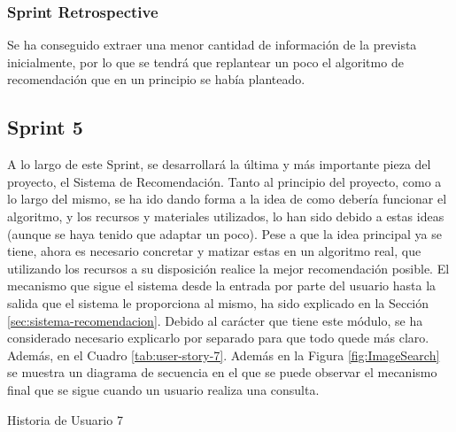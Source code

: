 \subsubsection{Sprint Retrospective}

Se ha conseguido extraer una menor cantidad de información de la prevista inicialmente, por lo que se tendrá que replantear un poco el algoritmo de recomendación que en un principio se había planteado.

\subsection{Sprint 5}
A lo largo de este Sprint, se desarrollará la última y más importante pieza del proyecto, el Sistema de Recomendación. Tanto al principio del proyecto, como a lo largo del mismo, se ha ido dando forma a la idea de como debería funcionar el algoritmo, y los recursos y materiales utilizados, lo han sido debido a estas ideas (aunque se haya tenido que adaptar un poco). Pese a que la idea principal ya se tiene, ahora es necesario concretar y matizar estas en un algoritmo real, que utilizando los recursos a su disposición realice la mejor recomendación posible. El mecanismo que sigue el sistema desde la entrada por parte del usuario hasta la salida que el sistema le proporciona al mismo, ha sido explicado en la Sección \ref{sec:sistema-recomendacion}. Debido al carácter que tiene este módulo, se ha considerado necesario explicarlo por separado para que todo quede más claro. Además, en el Cuadro \ref{tab:user-story-7}. Además en la Figura \ref{fig:ImageSearch} se muestra un diagrama de secuencia en el que se puede observar el mecanismo final que se sigue cuando un usuario realiza una consulta.

\begin{table}[hp]
  \centering
  {\small
  
  }
  \caption{Historia de Usuario 7}
  \label{tab:user-story-7}
\end{table}

